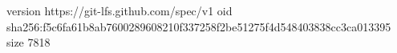 version https://git-lfs.github.com/spec/v1
oid sha256:f5c6fa61b8ab7600289608210f337258f2be51275f4d548403838cc3ca013395
size 7818
